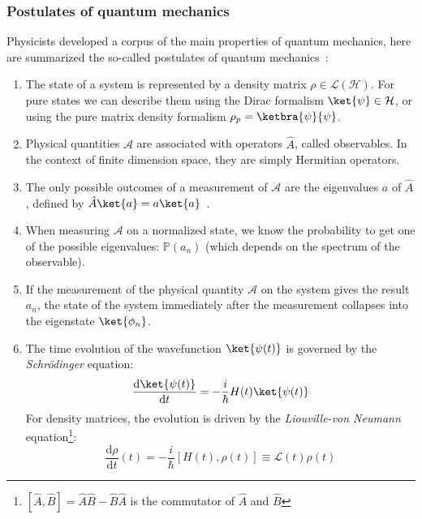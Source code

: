 \subsubsection{Postulates of quantum mechanics}
Physicists developed a corpus of the main properties of quantum mechanics, here are summarized the so-called postulates of quantum mechanics~\cite{CT}:
\begin{enumerate}
    \item The state of a system is represented by a density matrix $\rho\in\mathcal{L(H)}$. For pure states we can describe them using the Dirac formalism $\ket{\psi}\in\mathcal{H}$, or using the pure matrix density formalism $\rho_p=\ketbra{\psi}{\psi}$. 
    \item Physical quantities $\mathcal{A}$ are associated with operators $\hat{A}$, called observables. In the context of finite dimension space, they are simply Hermitian operators.
    \item The only possible outcomes of a measurement of $\mathcal{A}$ are the eigenvalues $a$ of $\hat{A}$, defined by $\hat{A}\ket{a}=a\ket{a}$~.
    \item When measuring $\mathcal{A}$ on a normalized state, we know the probability to get one of the possible eigenvalues: $\mathbb{P}(a_n)$ (which depends on the spectrum of the observable).
    \item If the measurement of the physical quantity $\mathcal{A}$ on the system gives the result $a_n$, the state of the system immediately after the measurement collapses into the eigenstate $\ket{\phi_n}$.
    \item The time evolution of the wavefunction $\ket{\psi(t)}$ is governed by the \textit{Schrödinger} equation:
    \begin{equation*}
    \frac{\mathrm{d}\ket{\psi(t)}}{\mathrm{d} t}=-\frac{i}{\hbar}H(t)\ket{\psi(t)}
    \end{equation*}
    For density matrices, the evolution is driven by the \textit{Liouville-von Neumann} equation\footnote{$[\hat{A},\hat{B}]=\hat{A}\hat{B}-\hat{B}\hat{A}$ is the commutator of $\hat{A}$ and $\hat{B}$}:
    \begin{equation}
        \frac{\mathrm{d}\rho}{\mathrm{d}t}(t) = -\frac{i}{\hbar}\left[ H(t),\rho(t)\right]\equiv\mathcal{L}(t)\rho(t)
    \end{equation}
    
\end{enumerate}
